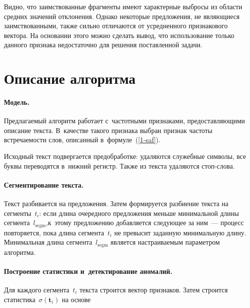 \begin{multicols}{2}
Видно, что заимствованные фрагменты имеют характерные выбросы из области средних 
значений отклонения. Однако некоторые предложения, не являющиеся 
заимствованными, также сильно отличаются от усредненного признакового вектора. 
На основании этого можно сделать вывод, что использование только данного 
признака недостаточно для решения поставленной задачи.

\section{Описание алгоритма}


\paragraph*{Модель.}
Предлагаемый алгоритм работает с~час\-тот\-ны\-ми признаками, предоставляющими 
описание текста. В~качестве такого признака выбран признак частоты встречаемости 
слов, описанный в~формуле~(\ref{1-saf}).

Исходный текст подвергается предобработке: удаляются служебные символы, все 
буквы переводятся в~нижний регистр. Также  из текста удаляются стоп-слова.

\vspace*{-8pt}

\paragraph*{Сегментирование текста.}
Текст разбивается на предложения. Затем формируется разбиение текста на 
сегменты~$t_i$: если длина очередного предложения
 меньше минимальной длины 
сегмента~$l_{\mathrm{segm}}$,\linebreak к~этому предложению добавляется следующее за ним~--- процесс 
повторяется, пока длина сегмента~$t_i$ не превысит заданную минимальную длину. 
Минимальная длина сегмента~$l_{\mathrm{segm}}$ является настраиваемым параметром 
алгоритма.

\vspace*{-8pt}

\paragraph*{Построение статистики и~детектирование аномалий.}
Для каждого сегмента~$t_i$ текста строится  вектор признаков. Затем строится 
статистика~$\sigma (\mathbf{t}_i)$ на основе\linebreak\vspace*{-12pt}


\end{multicols}
